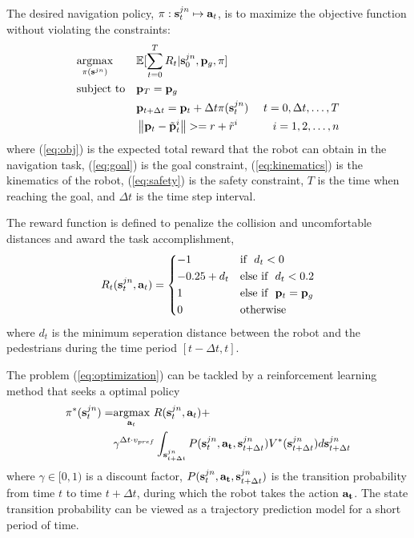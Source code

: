 \documentclass[letterpaper, 10 pt, conference]{ieeeconf}  %
\begin{document}
The desired navigation policy, $\pi : \bold{s}_t^{jn} \mapsto \bold{a}_t$, is to maximize the objective function without violating the constraints:
\begin{subequations} \label{eq:optimization}
\begin{align}
& \underset{\pi(\bold{s}^{jn})}{\text{argmax}}
& & \mathbb{E}[\sum_{t=0}^T R_t | \bold{s}_0^{jn}, \bold{p}_g, \pi] \label{eq:obj} \\
& \text{subject to} 
& & \bold{p}_T = \bold{p}_g \label{eq:goal} \\
&&& \bold{p}_{t+\Delta t} = \bold{p}_{t} + \Delta t \pi(\bold{s}_{t}^{jn}) \label{eq:kinematics} ~ & t = 0, \Delta t, \dots, T \\
&&& \left\Vert \bold{p}_t - \tilde{\bold{p}}_t^i \right\Vert >= r + \tilde{r}^i & i = 1, 2, \dots, n \label{eq:safety}
\end{align}
\end{subequations}
where (\ref{eq:obj}) is the expected total reward that the robot can obtain in the navigation task, (\ref{eq:goal}) is the goal constraint, (\ref{eq:kinematics}) is the kinematics of the robot, (\ref{eq:safety}) is the safety constraint, $T$ is the time when reaching the goal, and $\Delta t$ is the time step interval. 

The reward function is defined to penalize the collision and uncomfortable distances and award the task accomplishment, 
\begin{equation}
    R_t(\bold{s}_t^{jn},\bold{a}_t)= 
\begin{dcases}
    -1 & \text{if} ~~ d_t < 0 \\
    -0.25 + d_t & \text{else if} ~~ d_t < 0.2 \\
    1 & \text{else if} ~~ \bold{p}_t=\bold{p}_g \\
    0 & \text{otherwise} 
\end{dcases}
\end{equation}
where $d_t$ is the minimum seperation distance between the robot and the pedestrians during the time period $[t-\Delta t,t]$. 

The problem (\ref{eq:optimization}) can be tackled by a reinforcement learning method that seeks a optimal policy 
\begin{equation} \label{eq:RL}
\begin{split}
\pi^{*}(\bold{s}_t^{jn}) = & \underset{\bold{a}_t}{\text{argmax}} ~ R(\bold{s}_t^{jn},\bold{a}_t) + \\
& \gamma^{\Delta t \cdot v_{pref}} \int_{\bold{s}_{t+\Delta t}^{jn}} P(\bold{s}_t^{jn},\bold{a_t},\bold{s}_{t+\Delta t}^{jn}) V^*(\bold{s}_{t+\Delta t}^{jn}) d\bold{s}_{t+\Delta t}^{jn}
\end{split}
\end{equation}
where $\gamma \in [0,1)$ is a discount factor, $P(\bold{s}_t^{jn},\bold{a_t},\bold{s}_{t+\Delta t}^{jn}) $ is the transition probability from time $t$ to time $t+\Delta t$, during which the robot takes the action $\bold{a_t}$. The state transition probability can be viewed as a trajectory prediction model for a short period of time. 
\end{document}
